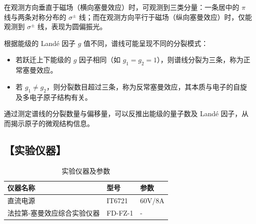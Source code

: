 \documentclass[12pt,a4paper,UTF8]{ctexart}
\begin{document}
在观测方向垂直于磁场（横向塞曼效应）时，可观测到三类分量：一条居中的 $\pi$ 线与两条对称分布的 $\sigma^\pm$ 线；而在观测方向平行于磁场（纵向塞曼效应）时，仅能观测到 $\sigma^\pm$ 线，表现为圆偏振光。

根据能级的 Landé 因子 $g$ 值不同，谱线可能呈现不同的分裂模式：

\begin{itemize}
  \item 若跃迁上下能级的 $g$ 因子相同（如 $g_1 = g_2 = 1$），则谱线分裂为三条，称为正常塞曼效应。
  \item 若 $g_1 \ne g_2$，则分裂数目超过三条，称为反常塞曼效应，其本质与电子的自旋及多电子原子结构有关。
\end{itemize}

通过测定谱线的分裂数量与偏移量，可以反推出能级的量子数及 Landé 因子，从而揭示原子的微观结构信息。

\subsection*{【实验仪器】}
\begin{table}[h!]
	\centering
	\begin{tabular}{|p{5cm} p{4cm} p{5cm}|}
		\hline
		仪器名称 & 型号 & 参数 \\
		\hline\hline
		直流电源 & IT6721 & 60V/8A \\
		法拉第-塞曼效应综合实验仪器 & FD-FZ-1 & - \\
		\hline		
	\end{tabular}
	\caption{实验仪器及参数}
	\label{tab:instruments}
\end{table}
\end{document}
